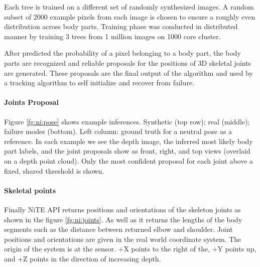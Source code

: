 

Each tree is trained on a different set of randomly synthesized images. A random subset of 2000 example pixels from each image is chosen to ensure a roughly even distribution across body parts. Training phase was conducted in distributed manner by training 3 trees from 1 million images on 1000 core cluster.

After predicted the probability of a pixel belonging to a body part, the body parts are recognized and reliable proposals for the positions of 3D skeletal joints are generated. These proposals are the final output of the algorithm and used by a tracking algorithm to self initialize and recover from failure.



\paragraph*{Joints Proposal} Figure \ref{fg:ni:pose} shows example inferences. Synthetic (top row); real (middle); failure modes (bottom). Left column: ground truth for a neutral pose as a reference. In each example we see the depth image, the inferred most likely body part labels, and the joint proposals show as front, right, and top views (overlaid on a depth point cloud). Only the most confident proposal for each joint above a fixed, shared threshold is shown.

\paragraph*{Skeletal points} Finally NiTE API returns positions and orientations of the skeleton joints as shown in the figure \ref{fg:ni:joints}. As well as it returns the lengths of the body segments such as the distance between returned elbow and shoulder. Joint positions and orientations are given in the real world coordinate system. The origin of the system is at the sensor. +X points to the right of the, +Y points up, and +Z points in the direction of increasing depth. 



